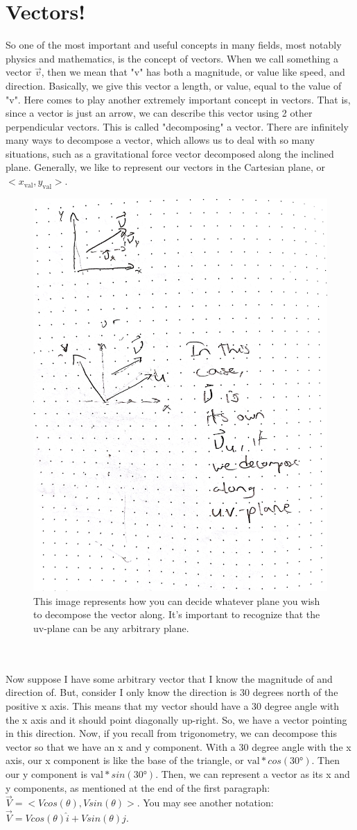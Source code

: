 \documentclass{article}
\begin{document}
\section{Vectors!}
So one of the most important and useful concepts in many fields, most notably physics and mathematics, is the concept of vectors. When we call something a vector $\vec{v}$, then we mean that "v" has both a magnitude, or value like speed, and direction. Basically, we give this vector a length, or value, equal to the value of "v". Here comes to play another extremely important concept in vectors. That is, since a vector is just an arrow, we can describe this vector using 2 other perpendicular vectors. This is called "decomposing" a vector. There are infinitely many ways to decompose a vector, which allows us to deal with so many situations, such as a gravitational force vector decomposed along the inclined plane. Generally, we like to represent our vectors in the Cartesian plane, or $<x_\text{val},y_\text{val}>$. \\
\begin{figure}[!h]
\center
    \includegraphics[width=.4\textwidth]{Vectors1.jpg}
    \caption{This image represents how you can decide whatever plane you wish to decompose the vector along. It's important to recognize that the uv-plane can be any arbitrary plane.}
\end{figure}
\\
\\
Now suppose I have some arbitrary vector that I know the magnitude of and direction of. But, consider I only know the direction is 30 degrees north of the positive x axis. This means that my vector should have a 30 degree angle with the x axis and it should point diagonally up-right. So, we have a vector pointing in this direction. Now, if you recall from trigonometry, we can decompose this vector so that we have an x and y component. With a 30 degree angle with the x axis, our x component is like the base of the triangle, or $\text{val}*cos(\ang{30})$. Then our y component is $\text{val}*sin(\ang{30})$. Then, we can represent a vector as its x and y components, as mentioned at the end of the first paragraph: $\vec{V} = <V cos(\theta), V sin(\theta)>$. You may see another notation: $\vec{V} = V cos(\theta) \hat{i} + V sin(\theta) \hat{j}$.\\
\end{document}
